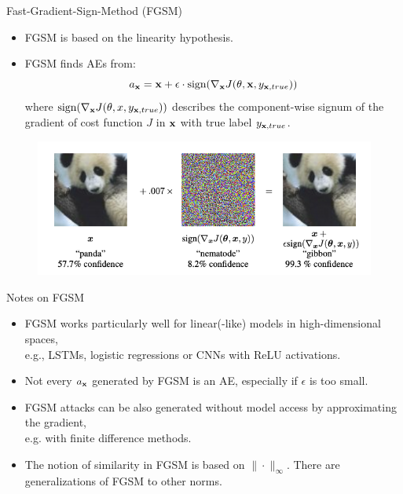 \documentclass[11pt,compress,t,notes=noshow, aspectratio=169, xcolor=table]{beamer}
\begin{document}
\begin{vbframe}{Fast-Gradient-Sign-Method (FGSM) }
\begin{itemize}
    \item FGSM is based on the linearity hypothesis.
    \item FGSM finds AEs from:
    \begin{equation*}
        a_{\xv}=\xv+\epsilon\cdot\text{sign}(\nabla_{\xv} J(\theta,\xv,y_{\xv,true}))
    \end{equation*}
    where $\text{sign}(\nabla_{\xv} J(\theta,x,y_{\xv,true}))$ describes the component-wise signum of the gradient of cost function $J$ in $\xv$ with true label $y_{\xv,true}$.
\end{itemize}
\begin{figure}[h]
\centering
\includegraphics[width=0.6\linewidth]{figure/AEpanda.png}
  \label{fig:mnist}
\end{figure} 

\end{vbframe}

\begin{vbframe}[c]{Notes on FGSM  }
\begin{itemize}
    \item FGSM works particularly well for linear(-like) models in high-dimensional spaces,\\ e.g., LSTMs, logistic regressions or CNNs with ReLU activations.
    \item Not every $a_{\xv}$ generated by FGSM is an AE, especially if $\epsilon$ is too small.
    \item FGSM attacks can be also generated without model access by approximating the gradient,\\ e.g. with finite difference methods.
    \item The notion of similarity in FGSM is based on $\|\cdot\|_{\infty}$. There are generalizations of FGSM to other norms.
\end{itemize}
\end{vbframe}
\end{document}

